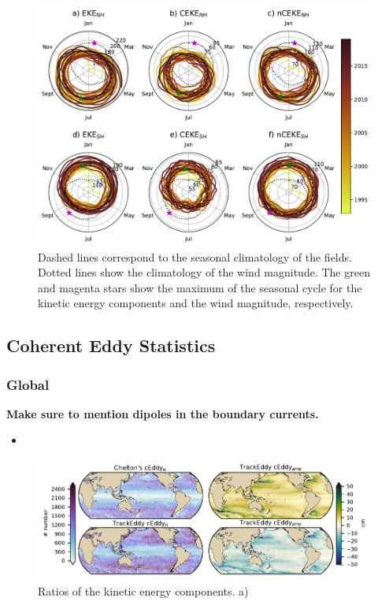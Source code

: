\documentclass[draft]{agujournal2019}
\begin{document}
	\begin{figure}
	    \centering
	    \includegraphics[width=1\textwidth]{figures/All_polar_plots.pdf}
	    \caption{Dashed lines correspond to the seasonal climatology of the fields. Dotted lines show the climatology of the wind magnitude. The green and magenta stars show the maximum of the seasonal cycle for the kinetic energy components and the wind magnitude, respectively. }
	    \label{fig:my_label}
	\end{figure}
	
	\subsection{Coherent Eddy Statistics}

	\subsubsection{Global}
	
	\textbf{Make sure to mention dipoles in the boundary currents.}

    \begin{itemize}
		\item 
	\end{itemize}

	\begin{figure}
	    \centering
	    \includegraphics[width=1\textwidth]{figures/global_stats_polarity.pdf}
	    \caption{Ratios of the kinetic energy components. a) }
	    \label{fig:my_label}
	\end{figure}
\end{document}
